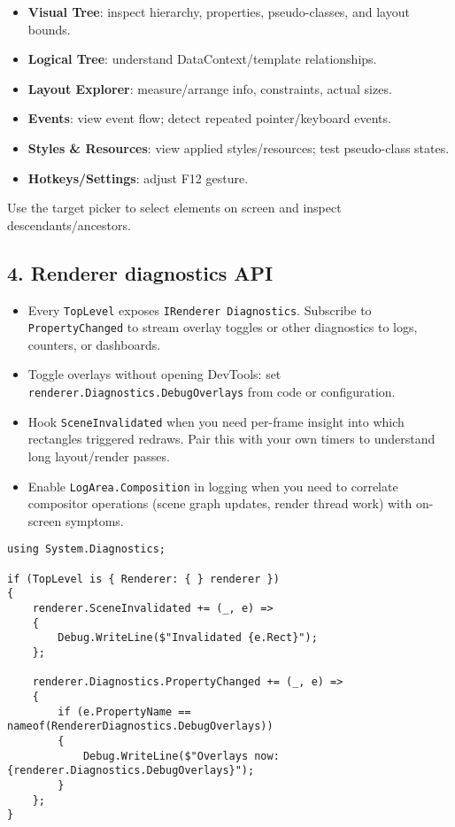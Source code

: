 \begin{itemize}
\tightlist
\item
  \textbf{Visual Tree}: inspect hierarchy, properties, pseudo-classes,
  and layout bounds.
\item
  \textbf{Logical Tree}: understand DataContext/template relationships.
\item
  \textbf{Layout Explorer}: measure/arrange info, constraints, actual
  sizes.
\item
  \textbf{Events}: view event flow; detect repeated pointer/keyboard
  events.
\item
  \textbf{Styles \& Resources}: view applied styles/resources; test
  pseudo-class states.
\item
  \textbf{Hotkeys/Settings}: adjust F12 gesture.
\end{itemize}

Use the target picker to select elements on screen and inspect
descendants/ancestors.

\subsection{4. Renderer diagnostics API}\label{renderer-diagnostics-api}

\begin{itemize}
\tightlist
\item
  Every \passthrough{\lstinline!TopLevel!} exposes
  \passthrough{\lstinline!IRenderer Diagnostics!}. Subscribe to
  \passthrough{\lstinline!PropertyChanged!} to stream overlay toggles or
  other diagnostics to logs, counters, or dashboards.
\item
  Toggle overlays without opening DevTools: set
  \passthrough{\lstinline!renderer.Diagnostics.DebugOverlays!} from code
  or configuration.
\item
  Hook \passthrough{\lstinline!SceneInvalidated!} when you need
  per-frame insight into which rectangles triggered redraws. Pair this
  with your own timers to understand long layout/render passes.
\item
  Enable \passthrough{\lstinline!LogArea.Composition!} in logging when
  you need to correlate compositor operations (scene graph updates,
  render thread work) with on-screen symptoms.
\end{itemize}

\begin{lstlisting}
using System.Diagnostics;

if (TopLevel is { Renderer: { } renderer })
{
    renderer.SceneInvalidated += (_, e) =>
    {
        Debug.WriteLine($"Invalidated {e.Rect}");
    };

    renderer.Diagnostics.PropertyChanged += (_, e) =>
    {
        if (e.PropertyName == nameof(RendererDiagnostics.DebugOverlays))
        {
            Debug.WriteLine($"Overlays now: {renderer.Diagnostics.DebugOverlays}");
        }
    };
}
\end{lstlisting}

